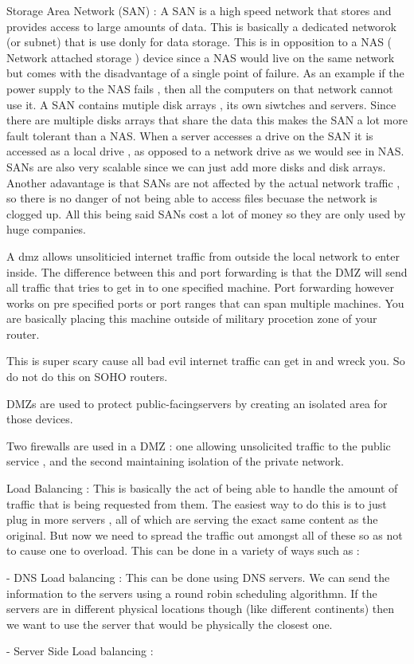 Storage Area Network (SAN) : A SAN is a high speed network that stores and
provides access to large amounts of data. This is basically a dedicated networok
(or subnet) that is use donly for data storage. This is in opposition to a NAS (
Network attached storage ) device since a NAS would live on the same network but
comes with the disadvantage of a single point of failure. As an example if the
power supply to the NAS fails , then all the computers on that network cannot
use it. A SAN contains mutiple disk arrays , its own siwtches and servers. Since
there are multiple disks arrays that share the data this makes the SAN a lot
more fault tolerant than a NAS. When a server accesses a drive on the SAN it is
accessed as a local drive , as opposed to a network drive as we would see in
NAS. SANs are also very scalable since we can just add more disks and disk
arrays. Another adavantage is that SANs are not affected by the actual network
traffic , so there is no danger of not being able to access files becuase the
network is clogged up. All this being said SANs cost a lot of money so they are
only used by huge companies.


A dmz allows unsoliticied internet traffic from outside the local network to
enter inside. The difference between this and port forwarding is that the DMZ
will send all traffic that tries to get in to one specified machine. Port
forwarding however works on pre specified ports or port ranges that can span
multiple machines. You are basically placing this machine outside of military
procetion zone of your router.


This is super scary cause all bad evil internet traffic can
get in and wreck you. So do not do this on SOHO routers.

DMZs are used to protect public-facingservers by creating an isolated area for
those devices.

Two firewalls are used in a DMZ : one allowing unsolicited traffic to the public
service , and the second maintaining isolation of the private network.







Load Balancing : This is basically the act of being able to handle the amount of
traffic that is being requested from them. The easiest way to do this is to just
plug in more servers , all of which are serving the exact same content as the
original. But now we need to spread the traffic out amongst all of these so as
not to cause one to overload. This can be done in a variety of ways such as :


 - DNS Load balancing : This can be done using DNS servers. We can send
the information to the servers using a round robin scheduling algorithmn. If the
servers are in different physical locations though (like different continents)
then we want to use the server that would be physically the closest one.

- Server Side Load balancing :


